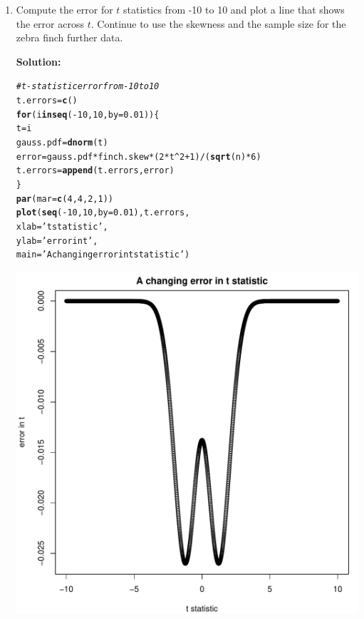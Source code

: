 \documentclass{article}\usepackage[]{graphicx}\usepackage[]{xcolor}
\makeatletter
\def\maxwidth{ %
  \ifdim\Gin@nat@width>\linewidth
    \linewidth
  \else
    \Gin@nat@width
  \fi
}
\newcommand{\hlnum}[1]{\textcolor[rgb]{0.686,0.059,0.569}{#1}}%
\newcommand{\hlsng}[1]{\textcolor[rgb]{0.192,0.494,0.8}{#1}}%
\newcommand{\hlcom}[1]{\textcolor[rgb]{0.678,0.584,0.686}{\textit{#1}}}%
\newcommand{\hlopt}[1]{\textcolor[rgb]{0,0,0}{#1}}%
\newcommand{\hldef}[1]{\textcolor[rgb]{0.345,0.345,0.345}{#1}}%
\newcommand{\hlkwa}[1]{\textcolor[rgb]{0.161,0.373,0.58}{\textbf{#1}}}%
\newcommand{\hlkwb}[1]{\textcolor[rgb]{0.69,0.353,0.396}{#1}}%
\newcommand{\hlkwc}[1]{\textcolor[rgb]{0.333,0.667,0.333}{#1}}%
\newcommand{\hlkwd}[1]{\textcolor[rgb]{0.737,0.353,0.396}{\textbf{#1}}}%
\newenvironment{kframe}{%
 \def\at@end@of@kframe{}%
 \ifinner\ifhmode%
  \def\at@end@of@kframe{\end{minipage}}%
  \begin{minipage}{\columnwidth}%
 \fi\fi%
 \def\FrameCommand##1{\hskip\@totalleftmargin \hskip-\fboxsep
 \colorbox{shadecolor}{##1}\hskip-\fboxsep
     \hskip-\linewidth \hskip-\@totalleftmargin \hskip\columnwidth}%
 \MakeFramed {\advance\hsize-\width
   \@totalleftmargin\z@ \linewidth\hsize
   \@setminipage}}%
 {\par\unskip\endMakeFramed%
 \at@end@of@kframe}
\newenvironment{knitrout}{}{} %
\makeatother
\begin{document}
\begin{enumerate}
\begin{enumerate}
  \item Compute the error for $t$ statistics from -10 to 10 and plot a line
  that shows the error across $t$. Continue to use the skewness and 
  the sample size for the zebra finch further data.
  
  \textbf{Solution:}
\begin{knitrout}\scriptsize
{}\color{fgcolor}\begin{kframe}
\begin{alltt}
\hlcom{#t-statistic error from -10 to 10}
\hldef{t.errors} \hlkwb{=} \hlkwd{c}\hldef{()}
\hlkwa{for} \hldef{(i} \hlkwa{in} \hlkwd{seq}\hldef{(}\hlopt{-}\hlnum{10}\hldef{,} \hlnum{10}\hldef{,} \hlkwc{by} \hldef{=} \hlnum{0.01}\hldef{))\{}
\hldef{t} \hlkwb{=} \hldef{i}
\hldef{gauss.pdf}  \hlkwb{=} \hlkwd{dnorm}\hldef{(t)}
\hldef{error} \hlkwb{=} \hldef{gauss.pdf}\hlopt{*}\hldef{finch.skew}\hlopt{*}\hldef{(}\hlnum{2}\hlopt{*}\hldef{t}\hlopt{^}\hlnum{2} \hlopt{+} \hlnum{1}\hldef{)}\hlopt{/}\hldef{(}\hlkwd{sqrt}\hldef{(n)}\hlopt{*}\hlnum{6}\hldef{)}
\hldef{t.errors} \hlkwb{=} \hlkwd{append}\hldef{(t.errors, error)}
\hldef{\}}
\hlkwd{par}\hldef{(}\hlkwc{mar} \hldef{=} \hlkwd{c}\hldef{(}\hlnum{4}\hldef{,} \hlnum{4}\hldef{,} \hlnum{2}\hldef{,} \hlnum{1}\hldef{))}
\hlkwd{plot}\hldef{(}\hlkwd{seq}\hldef{(}\hlopt{-}\hlnum{10}\hldef{,} \hlnum{10}\hldef{,} \hlkwc{by} \hldef{=} \hlnum{0.01}\hldef{), t.errors,}
   \hlkwc{xlab} \hldef{=} \hlsng{'t statistic'}\hldef{,}
   \hlkwc{ylab} \hldef{=} \hlsng{'error in t'}\hldef{,}
   \hlkwc{main} \hldef{=} \hlsng{'A changing error in t statistic'}\hldef{)}
\end{alltt}
\end{kframe}
\includegraphics[width=\maxwidth]{figure/unnamed-chunk-3-1} 
\end{knitrout}


\end{enumerate}
\end{enumerate}
\end{document}

